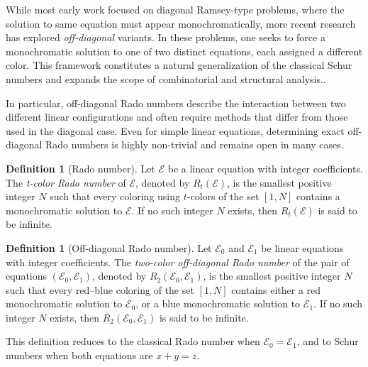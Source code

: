 \documentclass[preprint,12pt]{elsarticle}
\theoremstyle{plain}
\theoremstyle{definition}
\newtheorem{defn}[thm]{Definition}
\begin{document}
While most early work focused on diagonal Ramsey-type problems, where the solution to same equation must appear monochromatically, more recent research has explored \emph{off-diagonal} variants.  In these problems, one seeks to force a monochromatic solution to one of two distinct equations, each assigned a different color. This framework constitutes a natural generalization of the classical Schur numbers and expands the scope of combinatorial and structural analysis..

In particular, off-diagonal Rado numbers describe the interaction between two different linear configurations and often require methods that differ from those used in the diagonal case. Even for simple linear equations, determining exact off-diagonal Rado numbers is highly non-trivial and remains open in many cases.

\begin{defn}[Rado number]
Let $\mathcal{E}$ be a linear equation with integer coefficients. 
The \emph{t-color Rado number} of $\mathcal{E}$, denoted by $R_t(\mathcal{E})$, is the smallest positive integer $N$ such that every %
coloring using $t$-colors of the set $[1,N]$ contains a monochromatic solution to $\mathcal{E}$. If no such integer $N$ exists, then $R_t(\mathcal{E})$ is said to be infinite.
\end{defn}

\begin{defn}[Off-diagonal Rado number]
Let $\mathcal{E}_0$ and $\mathcal{E}_1$ be linear equations with integer coefficients. 
The \emph{two-color off-diagonal Rado number} of the pair of equations $(\mathcal{E}_0,\mathcal{E}_1)$, denoted by $R_2(\mathcal{E}_0,\mathcal{E}_1)$, is the smallest positive integer $N$ such that every red--blue coloring of the set $[1,N]$ contains either a red monochromatic solution to $\mathcal{E}_0$, or a blue monochromatic solution to $\mathcal{E}_1$. If no such integer $N$ exists, then $R_2(\mathcal{E}_0,\mathcal{E}_1)$ is said to be infinite.
\end{defn} This definition reduces to the classical Rado number when $\mathcal{E}_0=\mathcal{E}_1$, and to Schur numbers when both equations are $x+y=z$.
\end{document}
